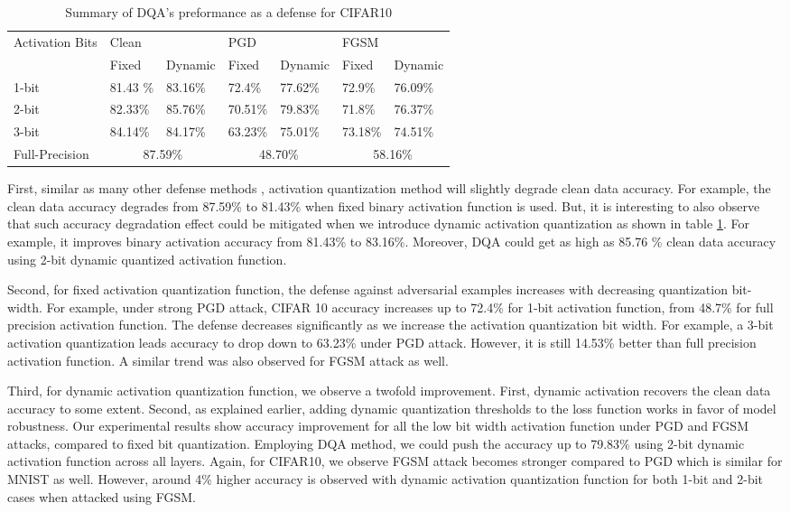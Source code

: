 \documentclass{article}
\begin{document}
\begin{table}[ht]
\begin{tabular}{|l|l|l|l|l|l|l|}
\hline
\multirow{2}{*}{Activation Bits} & \multicolumn{2}{l|}{Clean} & \multicolumn{2}{l|}{PGD} & \multicolumn{2}{l|}{FGSM} \\ \cline{2-7} 
 & Fixed & Dynamic & Fixed & Dynamic & Fixed & Dynamic \\ \hline
1-bit & 81.43 \% & 83.16\% & 72.4\% & 77.62\% & 72.9\% & 76.09\% \\ \hline
2-bit & 82.33\% & 85.76\% & 70.51\% & 79.83\% & 71.8\% & 76.37\% \\ \hline
3-bit & 84.14\% & 84.17\% & 63.23\% & 75.01\% & 73.18\% & 74.51\% \\ \hline
Full-Precision & \multicolumn{2}{c|}{87.59\%} & \multicolumn{2}{c|}{48.70\%} & \multicolumn{2}{c|}{58.16\%} \\ \hline
\end{tabular}
\centering
\caption{Summary of DQA's preformance as a defense for CIFAR10}
\label{my-label}
\end{table}

First, similar as many other defense methods \cite{madry2017towards,qian2018l2}, activation quantization method will slightly degrade clean data accuracy. For example, the clean data accuracy degrades from 87.59\% to 81.43\% when fixed binary activation function is used. But, it is interesting to also observe that such accuracy degradation effect could be mitigated when we introduce dynamic activation quantization as shown in table \ref{my-label}. For example, it improves binary activation accuracy from 81.43\% to 83.16\%. Moreover, DQA could get as high as 85.76 \% clean data accuracy using 2-bit dynamic quantized activation function.

Second, for fixed activation quantization function, the defense against adversarial examples increases with decreasing quantization bit-width. For example, under strong PGD attack, CIFAR 10 accuracy increases up to 72.4\% for 1-bit activation function, from 48.7\% for full precision activation function. The defense decreases significantly as we increase the activation  quantization bit width. For example, a 3-bit activation quantization leads accuracy to drop down to 63.23\% under PGD attack. However, it is still 14.53\% better than full precision activation function. A similar trend was also observed for FGSM attack as well.

Third, for dynamic activation quantization function, we observe a twofold improvement. First, dynamic activation recovers the clean data accuracy to some extent. Second, as explained earlier, adding dynamic quantization thresholds to the loss function works in favor of model robustness. Our experimental results show accuracy improvement for all the low bit width activation function under PGD and FGSM attacks, compared to fixed bit quantization. Employing DQA method, we could push the accuracy up to 79.83\% using 2-bit dynamic activation function across all layers. Again, for CIFAR10, we observe FGSM attack becomes stronger compared to PGD which is similar for MNIST as well. However, around 4\% higher accuracy is observed with dynamic activation quantization function for both 1-bit and 2-bit cases when attacked using FGSM. 
\end{document}
